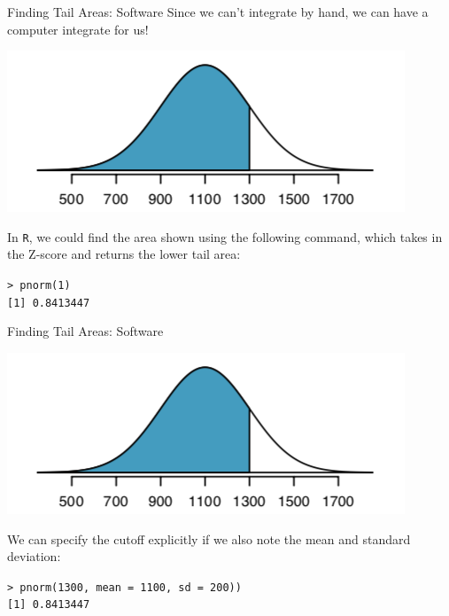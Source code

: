 \begin{frame}{Finding Tail Areas: Software}
    Since we can't integrate by hand, we can have a computer integrate for us!
    \begin{center}
        \includegraphics[scale=0.5]{images/tailarea.png}
    \end{center}
    In \texttt{R}, we could find the area shown using the following command, which takes in the Z-score and returns the lower tail area: 
    
    \hspace{1cm} \texttt{> pnorm(1)} \\ \hspace{1cm}\texttt{[1] 0.8413447}
\end{frame}

\begin{frame}{Finding Tail Areas: Software}
    \begin{center}
        \includegraphics[scale=0.5]{images/tailarea.png}
    \end{center}
    We can specify the cutoff explicitly if we also note the mean and standard deviation:
    
    \hspace{1cm} \texttt{> pnorm(1300, mean = 1100, sd = 200))} \\ \hspace{1cm}\texttt{[1] 0.8413447}
\end{frame}

